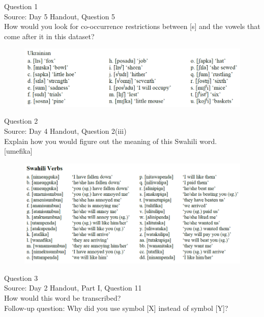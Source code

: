 \documentclass[12pt]{article}
\begin{document}
{\large Question 1}\\

Source: Day 5 Handout, Question 5\\

How would you look for co-occurrence restrictions between [s] and the vowels that come after it in this dataset?\\

\begin{figure}[H]
\includegraphics{../images/ukrainian.png}
\end{figure}

\newpage

{\large Question 2}\\

Source: Day 4 Handout, Question 2(iii)\\

Explain how you would figure out the meaning of this Swahili word.\\

{[umefika]}

\begin{figure}[H]
\includegraphics{../images/swahiliverbs.png}
\end{figure}

\newpage

{\large Question 3}\\

Source: Day 2 Handout, Part I, Question 11\\

How would this word be transcribed?\\ Follow-up question: Why did you use symbol [X] instead of symbol [Y]?\\
\end{document}

